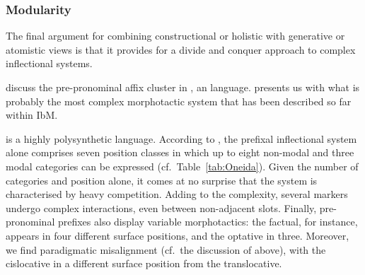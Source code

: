 \documentclass[output=paper
 	        ,biblatex
                ,babelshorthands
                ,newtxmath
                ,draftmode
                ,colorlinks, citecolor=brown
]{langscibook}
\begin{document}
\begin{exe}
\begin{xlist}
\begin{exe}
\begin{xlist}
\subsubsection{Modularity}

The final argument for combining constructional or holistic with
generative or atomistic views is that it provides for a divide and
conquer approach to complex inflectional systems.

\citet{diaz:koenig:michelson:19} discuss the pre-pronominal affix
cluster in , an  language.  presents us with what
is probably the most complex morphotactic system that has been
described so far within IbM.

 is a highly polysynthetic language. According to
\citet{diaz:koenig:michelson:19}, the prefixal inflectional system alone
comprises seven  position classes in which up to eight
non-modal and three modal categories can be expressed
(cf.\ Table~\ref{tab:Oneida}). Given the number of categories and
position alone, it comes at no surprise that the system is
characterised by heavy competition. Adding to the complexity, several
markers undergo complex interactions, even between non-adjacent slots.
Finally,  pre-pronominal prefixes also display variable
morphotactics: the factual, for instance, appears in four different surface
positions, and the optative in three. Moreover, we find paradigmatic
misalignment (cf.\ the discussion of  above), with the
cislocative in a different surface position from the translocative.

\begin{table}
  \centering
{}
  \caption{Position classes of Oneida inflectional prefixes
    \citep[435]{diaz:koenig:michelson:19}}
  \label{tab:Oneida}
\end{table}


\end{xlist}
\end{exe}
\end{xlist}
\end{exe}
\end{document}
